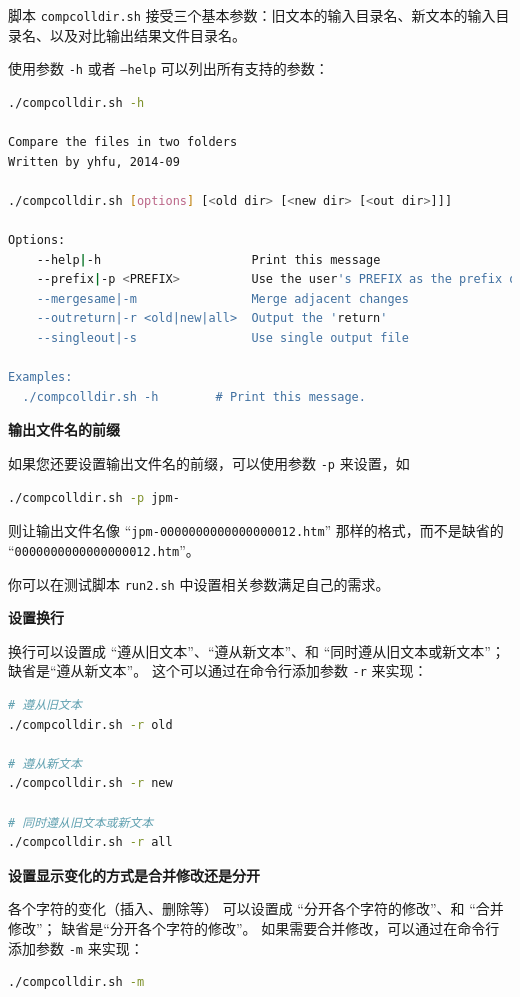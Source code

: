 \documentclass{article}
\begin{document}
脚本 \texttt{compcolldir.sh} 接受三个基本参数：旧文本的输入目录名、新文本的输入目录名、以及对比输出结果文件目录名。

使用参数 \texttt{-h} 或者 \texttt{--help} 可以列出所有支持的参数：
\begin{lstlisting}[language=bash]
./compcolldir.sh -h

Compare the files in two folders
Written by yhfu, 2014-09

./compcolldir.sh [options] [<old dir> [<new dir> [<out dir>]]] 

Options:
	--help|-h                     Print this message
	--prefix|-p <PREFIX>          Use the user's PREFIX as the prefix of data name (default: )
	--mergesame|-m                Merge adjacent changes
	--outreturn|-r <old|new|all>  Output the 'return'
	--singleout|-s                Use single output file

Examples:
  ./compcolldir.sh -h        # Print this message.
\end{lstlisting}


\textbf{输出文件名的前缀}

如果您还要设置输出文件名的前缀，可以使用参数 \texttt{-p} 来设置，如
\begin{lstlisting}[language=bash]
./compcolldir.sh -p jpm-
\end{lstlisting}

则让输出文件名像 ``\texttt{jpm-0000000000000000012.htm}'' 那样的格式，而不是缺省的 ``\texttt{0000000000000000012.htm}''。


你可以在测试脚本 \texttt{run2.sh} 中设置相关参数满足自己的需求。


\textbf{设置换行}

换行可以设置成 ``遵从旧文本''、``遵从新文本''、和 ``同时遵从旧文本或新文本''；
缺省是``遵从新文本''。
这个可以通过在命令行添加参数 \texttt{-r} 来实现：
\begin{lstlisting}[language=bash]
# 遵从旧文本
./compcolldir.sh -r old

# 遵从新文本
./compcolldir.sh -r new

# 同时遵从旧文本或新文本
./compcolldir.sh -r all
\end{lstlisting}


\textbf{设置显示变化的方式是合并修改还是分开}

各个字符的变化（插入、删除等）
可以设置成 ``分开各个字符的修改''、和 ``合并修改''；
缺省是``分开各个字符的修改''。
如果需要合并修改，可以通过在命令行添加参数 \texttt{-m} 来实现：
\begin{lstlisting}[language=bash]
./compcolldir.sh -m
\end{lstlisting}
\end{document}
